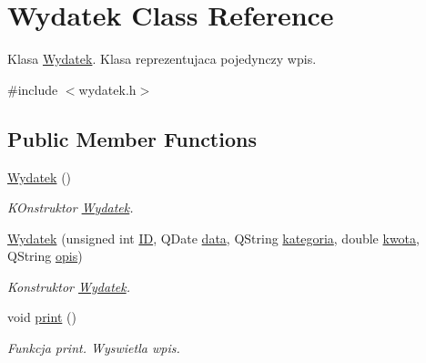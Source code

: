 \hypertarget{class_wydatek}{}\section{Wydatek Class Reference}
\label{class_wydatek}


Klasa \hyperlink{class_wydatek}{Wydatek}. Klasa reprezentujaca pojedynczy wpis.  




{\ttfamily \#include $<$wydatek.\+h$>$}

\subsection*{Public Member Functions}
\begin{DoxyCompactItemize}
\item 
\hypertarget{class_wydatek_a7588555254ce5ac1b84a3a7a52114a92}{}\hyperlink{class_wydatek_a7588555254ce5ac1b84a3a7a52114a92}{Wydatek} ()\label{class_wydatek_a7588555254ce5ac1b84a3a7a52114a92}

\begin{DoxyCompactList}\small\item\em K\+Onstruktor \hyperlink{class_wydatek}{Wydatek}. \end{DoxyCompactList}\item 
\hyperlink{class_wydatek_aaadfcce4a0c183388bfb9a2e8a1e5f4a}{Wydatek} (unsigned int \hyperlink{class_wydatek_aaa67349adee2d242127ca4e7114e800b}{I\+D}, Q\+Date \hyperlink{class_wydatek_a711d55393993069d2795f0d545de64d1}{data}, Q\+String \hyperlink{class_wydatek_a39c836807249ffa4c683455b5ef8b2a0}{kategoria}, double \hyperlink{class_wydatek_a1786e869ea300a3a9d2cef7e89a10419}{kwota}, Q\+String \hyperlink{class_wydatek_ac9ea73c7ca92621388756045fb467881}{opis})
\begin{DoxyCompactList}\small\item\em Konstruktor \hyperlink{class_wydatek}{Wydatek}. \end{DoxyCompactList}\item 
\hypertarget{class_wydatek_a175492204adf6f5c4f2da52ea095fe60}{}void \hyperlink{class_wydatek_a175492204adf6f5c4f2da52ea095fe60}{print} ()\label{class_wydatek_a175492204adf6f5c4f2da52ea095fe60}

\begin{DoxyCompactList}\small\item\em Funkcja print. Wyswietla wpis. \end{DoxyCompactList}\end{DoxyCompactItemize}
